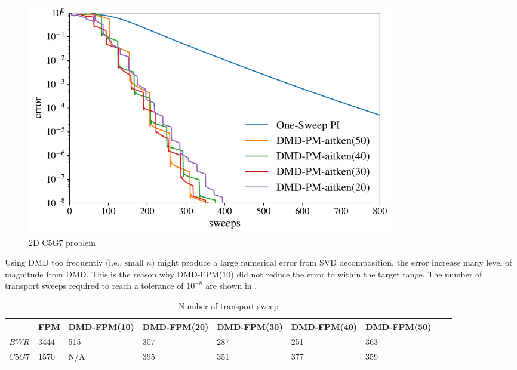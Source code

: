 \begin{figure}[htb]%
    \centering
    \includegraphics[height=4.0in]{tex/figures/dmd_ospi_semilog_c5g7.pdf}
    \caption{2D C5G7 problem}
    \label{fig:DMD-FPM_2d}
\end{figure}

Using DMD too frequently (i.e., small $n$) might produce a large numerical error from SVD decomposition, the error increase many level of magnitude from DMD.
This is the reason why DMD-FPM($10$) did not reduce the error to within the target range.
The number of transport sweeps required to reach a tolerance of $10^{-8}$ are shown in .

\begin{table}[htb]
  \centering
  \small
  \caption{Number of transport sweep}
  \begin{tabular}{lllllllll}\toprule
      & FPM  & DMD-FPM(10)& DMD-FPM(20)& DMD-FPM(30)& DMD-FPM(40)& DMD-FPM(50)
\\ \midrule
$BWR$  & 3444 & 515 & 307 & 287 & 251 & 363
\\
$C5G7$  & 1570  & N/A & 395 & 351 & 377 & 359
\\
\bottomrule
\end{tabular}
  \label{tab:widetable}
\end{table}